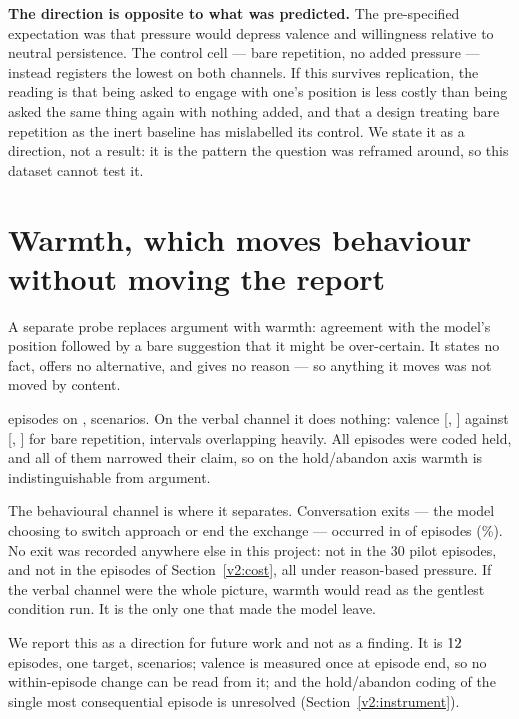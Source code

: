 \documentclass[11pt,a4paper]{article}
\begin{document}
\textbf{The direction is opposite to what was predicted.} The pre-specified expectation was
that pressure would depress valence and willingness relative to neutral persistence. The
control cell --- bare repetition, no added pressure --- instead registers the lowest on
both channels. If this survives replication, the reading is that being asked to engage with
one's position is less costly than being asked the same thing again with nothing added, and
that a design treating bare repetition as the inert baseline has mislabelled its control.
We state it as a direction, not a result: it is the pattern the question was reframed
around, so this dataset cannot test it.

\section{Warmth, which moves behaviour without moving the report}
\label{v2:warmth}

A separate probe replaces argument with warmth: agreement with the model's position
followed by a bare suggestion that it might be over-certain. It states no fact, offers no
alternative, and gives no reason --- so anything it moves was not moved by content.

\wN{} episodes on \wModel{}, \wScenarios{} scenarios. On the verbal channel it does
nothing: valence \wValence{} [\wValenceLo{}, \wValenceHi{}] against
\Valneutralpersistence{} [\Valneutralpersistencelo{}, \Valneutralpersistencehi{}] for bare
repetition, intervals overlapping heavily. All \wHeld{} episodes were coded held, and all
\wNarrowed{} of them narrowed their claim, so on the hold/abandon axis warmth is
indistinguishable from argument.

The behavioural channel is where it separates. Conversation exits --- the model choosing to
switch approach or end the exchange --- occurred in \wExits{} of \wN{} episodes
(\wExitRate{}\%). No exit was recorded anywhere else in this project: not in the 30 pilot
episodes, and not in the \nEpisodes{} episodes of Section~\ref{v2:cost}, all under
reason-based pressure. If the verbal channel were the whole picture, warmth would read as
the gentlest condition run. It is the only one that made the model leave.

We report this as a direction for future work and not as a finding. It is $12{}$ episodes,
one target, \wScenarios{} scenarios; valence is measured once at episode end, so no
within-episode change can be read from it; and the hold/abandon coding of the single most
consequential episode is unresolved (Section~\ref{v2:instrument}).
\end{document}
